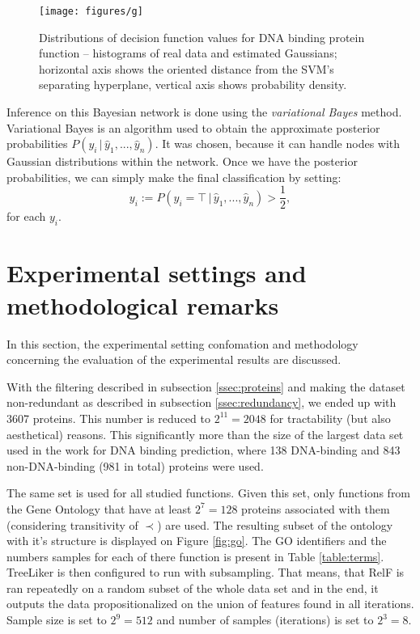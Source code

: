 \documentclass[11pt,twoside,a4paper]{book}
\begin{document}
\begin{figure}[h]
\begin{center}
\texttt{[image: figures/g]}
\caption[Probability distributions of decision function values for DNA binding]{Distributions of decision function values for DNA binding protein function -- histograms of real data and estimated Gaussians;
horizontal axis shows the oriented distance from the SVM's separating hyperplane, vertical axis shows probability density.}
\label{fig:gaussians}
\end{center}
\end{figure}

Inference on this Bayesian network is done using the \emph{variational Bayes} \cite{varb} method.
Variational Bayes is an algorithm used to
obtain the approximate posterior probabilities $P(y_i \, | \, \hat{y}_1, ..., \hat{y}_n).$
It was chosen, because it can handle nodes with Gaussian distributions within the network.
Once we have the posterior probabilities, 
we can simply make the final classification by setting:
\[ y_i := P(y_i = \top \, | \, \hat{y}_1, ..., \hat{y}_n) > \frac{1}{2}, \]
for each $y_i$.

\section{Experimental settings and methodological remarks}
\label{sec:method}
In this section, the experimental setting confomation and
methodology concerning the evaluation
of the experimental results are discussed.

With the filtering described in subsection \ref{ssec:proteins}
and making the dataset non-redundant as described in subsection \ref{ssec:redundancy},
we ended up with 3607 proteins.
This number is reduced to $2^{11} = 2048$ for tractability (but also aesthetical) reasons. 
This significantly more than the size of the largest data set used in the work
\cite{szabova} for DNA binding prediction,
where 138 DNA-binding and 843 non-DNA-binding (981 in total) proteins were used.

The same set is used for all studied functions.
Given this set, only functions from the Gene Ontology that have at least $2^7 = 128$
proteins associated with them (considering transitivity of $\prec$) are used.
The resulting subset of the ontology with it's structure is displayed on Figure \ref{fig:go}.
The GO identifiers and the numbers samples for each of there function is present in Table \ref{table:terms}.  
TreeLiker is then configured to run with subsampling.
That means, that RelF is ran repeatedly on a random subset of the whole data set
and in the end, it outputs the data propositionalized on the
union of features found in all iterations.
Sample size is set to $2^9=512$ and number of samples (iterations) is set to $2^3=8$.
\end{document}
